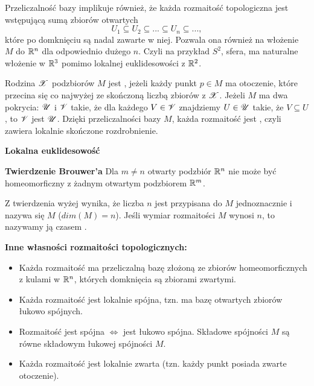 Przeliczalność bazy implikuje również, że każda rozmaitość topologiczna jest wstępującą sumą zbiorów otwartych
$$U_1\subseteq U_2\subseteq...\subseteq U_n\subseteq...,$$
które po domknięciu są nadal zawarte w niej. Pozwala ona również na włożenie $M$ do $\mathbb{R}^n$ dla odpowiednio dużego $n$. Czyli na przykład $S^2$, sfera, ma naturalne włożenie w $\mathbb{R}^3$ pomimo lokalnej euklidesowości z $\mathbb{R}^2$.

Rodzina $\mathcal{X}$ podzbiorów $M$ jest , jeżeli każdy punkt $p\in M$ ma otoczenie, które przecina się co najwyżej ze skończoną liczbą zbiorów z $\mathcal{X}$. Jeżeli $M$ ma dwa pokrycia: $\mathcal{U}$ i $\mathcal{V}$ takie, że dla każdego $V\in\mathcal{V}$ znajdziemy $U\in\mathcal{U}$ takie, że $V\subseteq U$, to $\mathcal{V}$ jest  $\mathcal{U}$. Dzięki przeliczalności bazy $M$, każda rozmaitość jest , czyli zawiera lokalnie skończone rozdrobnienie.

\textbf{Lokalna euklidesowość}

\begin{theorem}\label{twierdzebie brouwer'a} \textbf{\color{orange}Twierdzenie Brouwer'a} Dla $m\neq n$ otwarty podzbiór $\mathbb{R}^n$ nie może być homeomorficzny z żadnym otwartym podzbiorem $\mathbb{R}^m$.
\end{theorem}

Z twierdzenia wyżej wynika, że liczba $n$ jest przypisana do $M$ jednoznacznie i nazywa się  $M$ ($dim(M)=n$). Jeśli wymiar rozmaitości $M$ wynosi $n$, to nazywamy ją czasem .
\bigskip

\textbf{\large Inne własności rozmaitości topologicznych:}
\begin{itemize}
  \item Każda rozmaitość ma przeliczalną bazę złożoną ze zbiorów homeomorficznych z kulami w $\mathbb{R}^n$, których domknięcia są zbiorami zwartymi.
  \item Każda rozmaitość jest lokalnie spójna, tzn. ma bazę otwartych zbiorów łukowo spójnych.
  \item Rozmaitość jest spójna $\iff$ jest łukowo spójna. Składowe spójności $M$ są równe składowym łukowej spójności $M$.
  \item Każda rozmaitość jest lokalnie zwarta (tzn. każdy punkt posiada zwarte otoczenie).
\end{itemize}

